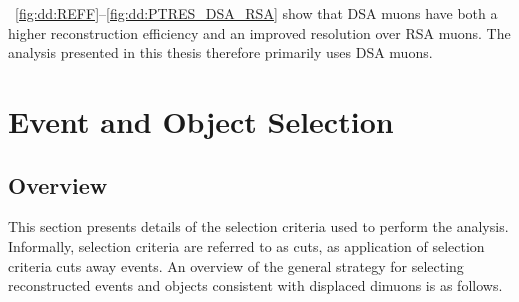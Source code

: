 \Figs~\ref{fig:dd:REFF}--\ref{fig:dd:PTRES_DSA_RSA} show that DSA muons have both a higher reconstruction efficiency and an improved \pT resolution over RSA muons.
The analysis presented in this thesis therefore primarily uses DSA muons.

\section{Event and Object Selection}
\subsection{Overview}
\label{sec:dd:GeneralStrategy}
This section presents details of the selection criteria used to perform the analysis.
Informally, selection criteria are referred to as cuts, as application of selection criteria cuts away events.
An overview of the general strategy for selecting reconstructed events and objects consistent with displaced dimuons is as follows.
\clearpage
